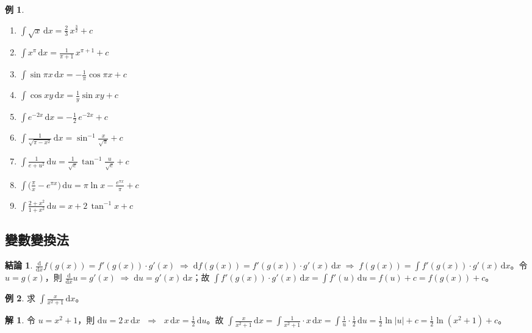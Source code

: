 \documentclass[12pt]{extarticle}
\newcommand{\ds}{\displaystyle}
\newcommand{\ie}{\;\Longrightarrow\;}
\theoremstyle{definition}
\newtheorem*{fact}{結論}
\newtheorem*{ex}{例}
\newtheorem*{sol}{解}
\begin{document}
\begin{ex}
  \setlength{\columnsep}{-7mm}
  \begin{multicols}{3}
    \begin{enumerate}\setlength{\itemsep}{0pt}
      \item $\ds\int\!\sqrt{x}\,\text{d}x = \frac{2}{3}\,x^{\frac{3}{2}} + c$
      \item $\ds\int x^\pi\,\text{d}x = \frac{1}{\pi + 1}\,x^{\pi + 1} + c$
      \item $\ds\int\!\sin\pi x\,\text{d}x = -\frac{1}{\pi}\cos\pi x + c$
      \item $\ds\int\!\cos xy\,\text{d}x = \frac{1}{y}\sin xy + c$
      \item $\ds\int e^{-2x}\,\text{d}x = -\frac{1}{2}\,e^{-2 x} + c$
      \item $\ds\int\!\frac{1}{\sqrt{\pi - x^2}}\,\text{d}x = \sin^{-1}\frac{x}{\sqrt{\pi}} + c$
      \item $\ds\int\!\frac{1}{e + u^2}\,\text{d}u = \frac{1}{\sqrt{e}}\,\tan^{-1}\frac{u}{\sqrt{e}} + c$
      \item $\ds\int\!\big(\frac{\pi}{x} - e^{\pi x}\big)\,\text{d}u = \pi\ln x - \frac{e^{\pi x}}{\pi} + c$
      \item $\ds\int\!\frac{2 + x^2}{1 + x^2}\,\text{d}u = x + 2\,\tan^{-1}x + c$
    \end{enumerate} 
  \end{multicols}
\end{ex}

\subsection*{變數變換法}

\begin{fact}
  $\ds\frac{\text{d}}{\text{d}x}f(g(x)) = f'(g(x))\cdot g'(x) \ie \text{d}f(g(x)) = f'(g(x))\cdot g'(x)\,\text{d}x \ie f(g(x)) = \int f'(g(x))\cdot g'(x)\,\text{d}x$。令 $\ds u = g(x)$，則 $\ds\frac{\text{d}}{\text{d}x} u = g'(x)\ie \text{d} u = g'(x)\,\text{d}x$；故 $\ds\int f'(g(x))\cdot g'(x)\,\text{d}x = \int f'(u)\,\text{d}u = f(u) + c = f(g(x)) + c$。 
\end{fact}

\begin{ex}
  求 $\ds\int\!\frac{x}{x^2+1}\,\mathrm{d}x$。
\end{ex}
\begin{sol}
  令 $\ds u = x^2 + 1$，則 $\ds\mathrm{d}u = 2\,x\,\mathrm{d}x$ $\ie$ $\ds x\,\mathrm{d}x=\frac{1}{2}\,\mathrm{d}u$。故 $\ds\int\!\frac{x}{x^2+1}\,\mathrm{d}x = \int\!\frac{1}{x^2+1}\cdot x\,\mathrm{d}x = \int\!\frac{1}{u}\cdot\frac{1}{2}\,\mathrm{d}u = \frac{1}{2}\ln|u| + c = \frac{1}{2}\ln(x^2 + 1) + c$。
\end{sol}
    
\end{document}
